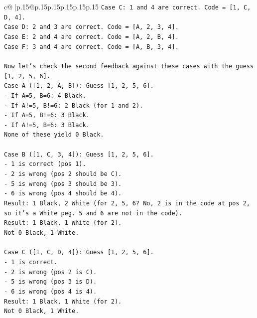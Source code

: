 \documentclass{article}
\begin{document}
{\begin{supertabular}{c@{$\;$}|p{.15\linewidth}@{}p{.15\linewidth}p{.15\linewidth}p{.15\linewidth}p{.15\linewidth}p{.15\linewidth}}
{{{\texttt{Case C: 1 and 4 are correct. Code = {[}1, C, D, 4{]}.} \\
\texttt{Case D: 2 and 3 are correct. Code = {[}A, 2, 3, 4{]}.} \\
\texttt{Case E: 2 and 4 are correct. Code = {[}A, 2, B, 4{]}.} \\
\texttt{Case F: 3 and 4 are correct. Code = {[}A, B, 3, 4{]}.} \\
\\ 
\texttt{Now let's check the second feedback against these cases with the guess {[}1, 2, 5, 6{]}.} \\
\texttt{Case A ({[}1, 2, A, B{]}): Guess {[}1, 2, 5, 6{]}.} \\
\texttt{{-} If A=5, B=6: 4 Black.} \\
\texttt{{-} If A!=5, B!=6: 2 Black (for 1 and 2).} \\
\texttt{{-} If A=5, B!=6: 3 Black.} \\
\texttt{{-} If A!=5, B=6: 3 Black.} \\
\texttt{None of these yield 0 Black.} \\
\\ 
\texttt{Case B ({[}1, C, 3, 4{]}): Guess {[}1, 2, 5, 6{]}.} \\
\texttt{{-} 1 is correct (pos 1).} \\
\texttt{{-} 2 is wrong (pos 2 should be C).} \\
\texttt{{-} 5 is wrong (pos 3 should be 3).} \\
\texttt{{-} 6 is wrong (pos 4 should be 4).} \\
\texttt{Result: 1 Black, 2 White (for 2, 5, 6? No, 2 is in the code at pos 2, so it's a White peg. 5 and 6 are not in the code).} \\
\texttt{Result: 1 Black, 1 White (for 2).} \\
\texttt{Not 0 Black, 1 White.} \\
\\ 
\texttt{Case C ({[}1, C, D, 4{]}): Guess {[}1, 2, 5, 6{]}.} \\
\texttt{{-} 1 is correct.} \\
\texttt{{-} 2 is wrong (pos 2 is C).} \\
\texttt{{-} 5 is wrong (pos 3 is D).} \\
\texttt{{-} 6 is wrong (pos 4 is 4).} \\
\texttt{Result: 1 Black, 1 White (for 2).} \\
\texttt{Not 0 Black, 1 White.} \\
\\ 
}}}
\end{supertabular}}
\end{document}
